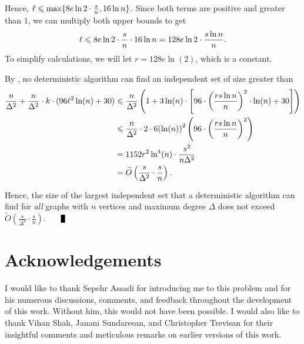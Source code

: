 \documentclass[11pt]{article}
\theoremstyle{definition}
\renewcommand{\qed}{\nobreak \ifvmode \relax \else
      \ifdim\lastskip<1.5em \hskip-\lastskip
      \hskip1.5em plus0em minus0.5em \fi \nobreak
      \vrule height0.75em width0.5em depth0.25em\fi}
\renewcommand{\leq}{\leqslant}
\renewcommand{\le}{\leq}
\newcommand{\Ot}{\ensuremath{\widetilde{O}}}
\begin{document}
Hence, ${\distribFac}\le \max\{8e\ln 2\cdot \frac sn, 16\ln n\}$. Since both terms are positive and greater than $1$, we can multiply both upper bounds to get
\begin{align*}
    {\distribFac}\le 8e\ln 2\cdot \frac sn\cdot 16\ln n=128e\ln 2\cdot \frac {s\ln n}n.
\end{align*}
To simplify calculations, we will let $r=128e\ln(2)$, which is a constant.

By , no deterministic algorithm can find an independent set of size greater than
\begin{align*}
\frac{n}{\Delta^2}+\frac{n}{\Delta^2}\cdot k\cdot (96{\distribFac}^2\ln(n)+30)&\le \frac n{\Delta^2}\left(1+3\ln(n)\cdot \left[96\cdot {\left(\frac{rs\ln n}n\right)}^2\cdot \ln(n)+30\right]\right)\\
&\le \frac n{\Delta^2}\cdot 2\cdot 6{(\ln(n))}^2\left(96\cdot {\left(\frac{rs\ln n}n\right)}^2\right)\\
&=1152r^2\ln^4(n)\cdot\frac{s^2}{n\Delta^2}\\
&= \Ot\left(\frac s{\Delta^2}\cdot \frac sn\right).
\end{align*}

Hence, the size of the largest independent set that a deterministic algorithm can find for \textit{all} graphs with $n$ vertices and maximum degree $\Delta$ does not exceed $\Ot\left(\frac s{\Delta^2}\cdot \frac sn\right)$. $\qed$

\section*{Acknowledgements}
I would like to thank Sepehr Assadi for introducing me to this problem and for his numerous discussions, comments, and feedback throughout the development of this work. Without him, this would not have been possible. I would also like to thank Vihan Shah, Janani Sundaresan, and Christopher Trevisan for their insightful comments and meticulous remarks on earlier versions of this work.



\end{document}
